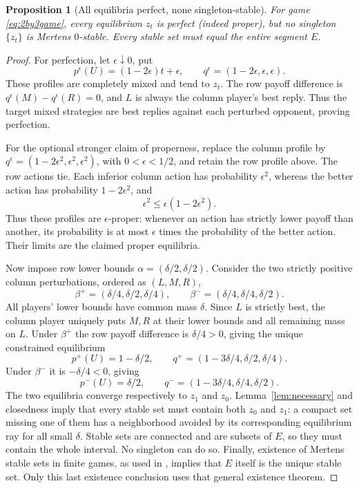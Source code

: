 \documentclass[11pt]{article}
\newtheorem{proposition}[theorem]{Proposition}
\theoremstyle{definition}
\theoremstyle{remark}
\begin{document}
\begin{proposition}[All equilibria perfect, none singleton-stable]
\label{prop:obstruction}
For game \eqref{eq:2by3game}, every equilibrium $z_t$ is perfect (indeed
proper), but no singleton $\{z_t\}$ is Mertens $0$-stable. Every stable set
must equal the entire segment $E$.
\end{proposition}
\begin{proof}
For perfection, let $\epsilon\downarrow0$, put
\[
 p^\epsilon(U)=(1-2\epsilon)t+\epsilon,\qquad
 q^\epsilon=(1-2\epsilon,\epsilon,\epsilon).
\]
These profiles are completely mixed and tend to $z_t$. The row payoff
difference is $q^\epsilon(M)-q^\epsilon(R)=0$, and $L$ is always the column
player's best reply. Thus the target mixed strategies are best replies
against each perturbed opponent, proving perfection.

For the optional stronger claim of properness, replace the column profile
by $q^\epsilon=(1-2\epsilon^2,\epsilon^2,\epsilon^2)$, with
$0<\epsilon<1/2$, and retain the row profile above. The row actions tie.
Each inferior column action has probability $\epsilon^2$, whereas the
better action has probability $1-2\epsilon^2$, and
\[
 \epsilon^2\le\epsilon(1-2\epsilon^2).
\]
Thus these profiles are $\epsilon$-proper: whenever an action has strictly
lower payoff than another, its probability is at most $\epsilon$ times
the probability of the better action. Their limits are the claimed proper
equilibria.

Now impose row lower bounds $\alpha=(\delta/2,\delta/2)$. Consider the two
strictly positive column perturbations, ordered as $(L,M,R)$,
\[
 \beta^+=(\delta/4,\delta/2,\delta/4),\qquad
 \beta^-=(\delta/4,\delta/4,\delta/2).
\]
All players' lower bounds have common mass $\delta$. Since $L$ is strictly
best, the column player uniquely puts $M,R$ at their lower bounds and all
remaining mass on $L$. Under $\beta^+$ the row payoff difference is
$\delta/4>0$, giving the unique constrained equilibrium
\[
 p^+(U)=1-\delta/2,\qquad
 q^+=(1-3\delta/4,\delta/2,\delta/4).
\]
Under $\beta^-$ it is $-\delta/4<0$, giving
\[
 p^-(U)=\delta/2,\qquad
 q^-=(1-3\delta/4,\delta/4,\delta/2).
\]
The two equilibria converge respectively to $z_1$ and $z_0$.
Lemma~\ref{lem:necessary} and closedness imply that every stable set
must contain both $z_0$ and $z_1$: a compact set missing one of them has a
neighborhood avoided by its corresponding equilibrium ray for all small
$\delta$. Stable sets are connected and are subsets of $E$, so they must
contain the whole interval. No singleton can do so. Finally, existence of
Mertens stable sets in finite games, as used in \cite{gw}, implies that $E$
itself is the unique stable set. Only this last existence conclusion uses
that general existence theorem.
\end{proof}
\end{document}
